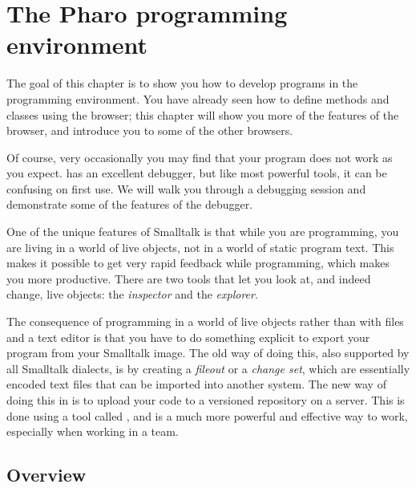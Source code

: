 \documentclass[a4paper,10pt,twoside]{book}
\begin{document}
	\sloppy
\fi
\chapter{The Pharo programming environment}

The goal of this chapter is to show you how to develop programs in the \pharo programming environment.
You have already seen how to define methods and classes using the browser; this chapter will show you more of the features of the browser, and introduce you to some of the other browsers.

Of course, very occasionally you may find that your program does not work as you expect. \pharo has an excellent debugger, but like most powerful tools, it can be confusing on first use.  We will walk you through a debugging session and demonstrate some of the features of the debugger. 

One of the unique features of Smalltalk is that while you are programming, you are living in a world of live objects, not in a world of static program text.  This makes it possible to get very rapid feedback while programming, which makes you more productive. There are two tools that let you look at, and indeed change, live objects: the \emph{inspector} and the \emph{explorer}.

The consequence of programming in a world of live objects rather than with files and a text editor is that you have to do something explicit to export your program from your Smalltalk image.  
The old way of doing this, also supported by all Smalltalk dialects, is by creating a \emph{fileout} or a \emph{change set}, which are essentially encoded text files that can be imported into another system.  
The new way of doing this in \pharo is to upload your code to a versioned repository on a server.  This is done using a tool called , and is a much more powerful and effective way to work, especially when working in a team.


\section{Overview}
\end{document}
